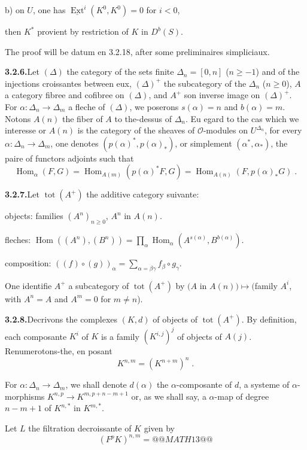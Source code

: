 \documentclass[12pt,a4paper]{article}
\theoremstyle{plain}
\theoremstyle{definition}
\DeclareMathOperator{\Hom}{Hom}
\DeclareMathOperator{\Ext}{Ext}
\DeclareMathOperator{\tot}{tot}
\begin{document}
b) on $U$, one has $\underline{\Ext}^i(K^0, K^0) = 0$ for $i < 0$,

then $K^*$ provient by restriction of $K$ in $D^b(S)$.

The proof will be datum en 3.2.18, after some preliminaires simpliciaux.

\smallskip
\noindent\textbf{3.2.6.}\quad Let $(\Delta)$ the category of the sets finite $\Delta_n = [0, n]$ ($n \geqslant -1$) and of the injections croissantes between eux, $(\Delta)^+$ the subcategory of the $\Delta_n$ ($n \geqslant 0$), $A$ a category fibree and cofibree on $(\Delta)$, and $A^+$ son inverse image on $(\Delta)^+$. For $\alpha : \Delta_n \to \Delta_m$ a fleche of $(\Delta)$, we poserons $s(\alpha) = n$ and $b(\alpha) = m$. Notons $A(n)$ the fiber of $A$ to the-dessus of $\Delta_n$. Eu egard to the cas which we interesse or $A(n)$ is the category of the sheaves of $\mathcal{O}$-modules on $U^{\Delta_n}$, for every $\alpha : \Delta_n \to \Delta_m$, one denotes $(p(\alpha)^*, p(\alpha)_*)$, or simplement $(\alpha^*, \alpha_*)$, the paire of functors adjoints such that
\[
\Hom_\alpha(F, G) = \Hom_{A(m)}(p(\alpha)^* F, G) = \Hom_{A(n)}(F, p(\alpha)_* G)\;.
\]

\smallskip
\noindent\textbf{3.2.7.}\quad Let $\tot(A^+)$ the additive category suivante:

objects: families $(A^n)_{n \geqslant 0}$, $A^n$ in $A(n)$.

fleches: $\Hom((A^n), (B^n)) = \prod_\alpha \Hom_\alpha(A^{s(\alpha)}, B^{b(\alpha)})$.

composition: $((f) \circ (g))_\alpha = \sum_{\alpha = \beta\gamma} f_\beta \circ g_\gamma$.

One identifie $A^+$ a subcategory of $\tot(A^+)$ by $(A$ in $A(n)) \longmapsto ($family $A^i$, with $A^n = A$ and $A^m = 0$ for $m \neq n$).

\smallskip
\noindent\textbf{3.2.8.}\quad Decrivons the complexes $(K, d)$ of objects of $\tot(A^+)$. By definition, each composante $K^i$ of $K$ is a family $(K^{i,j})^j$ of objects of $A(j)$. Renumerotons-the, en posant
\[
K^{n,m} = (K^{n+m})^n\;.
\]

For $\alpha : \Delta_n \to \Delta_m$, we shall denote $d(\alpha)$ the $\alpha$-composante of $d$, a systeme of $\alpha$-morphisms $K^{n,p} \to K^{m, p+n-m+1}$ or, as we shall say, a $\alpha$-map of degree $n-m+1$ of $K^{n,*}$ in $K^{m,*}$.

Let $L$ the filtration decroissante of $K$ given by
\[
(F^p K)^{n,m} = @@MATH13@@
\]
\end{document}
